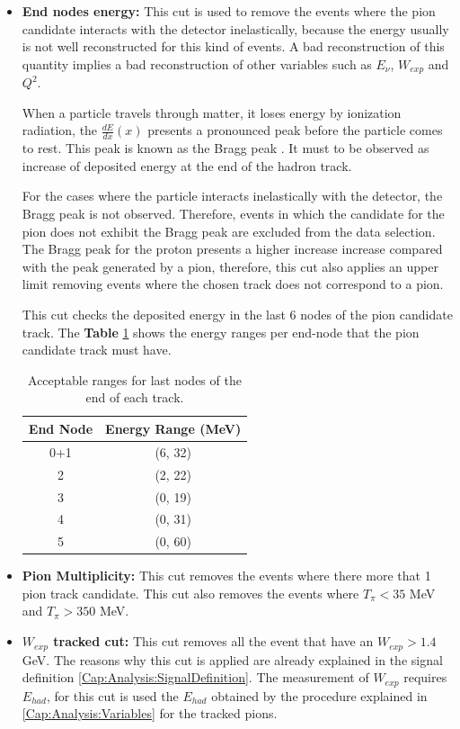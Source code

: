 \begin{itemize}
    
    \item \textbf{End nodes energy:} This cut is used to remove the events where the pion candidate interacts with the detector inelastically, because the energy usually is not well reconstructed for this kind of events. A bad reconstruction of this quantity implies a bad reconstruction of other variables such as $E_\nu$, $W_{exp}$ and $Q^2$. 

    When a particle travels through matter, it loses energy by ionization radiation, the $\frac{dE}{dx}(x)$ presents a pronounced peak before the particle comes to rest. This peak is known as the Bragg peak \cite{BraggCurves}. It must to be observed as increase of deposited energy at the end of the hadron track. 

    For the cases where the particle interacts inelastically with the detector, the Bragg peak is not observed. Therefore, events in which the candidate for the pion does not exhibit the Bragg peak are excluded from the data selection. The Bragg peak for the proton presents a higher increase increase compared with the peak generated by a pion, therefore, this cut also applies an upper limit removing events where the chosen track does not correspond to a pion. 

    This cut checks the deposited energy in the last 6 nodes of the pion candidate track. The \textbf{Table} \ref{tab:Analysis:Cuts:EndnodeCuts} shows the energy ranges per end-node that the pion candidate track must have.  

    \begin{table}[]
        \centering
        \begin{tabular}{c|c}
            End Node & Energy Range (MeV)\\ \hline
            0+1      & (6, 32) \\
            2        & (2, 22) \\
            3        & (0, 19) \\
            4        & (0, 31) \\
            5        & (0, 60) \\
        \end{tabular}
        \caption{Acceptable ranges for last nodes of the end of each track.}
        \label{tab:Analysis:Cuts:EndnodeCuts}
    \end{table}

    
    \item \textbf{Pion Multiplicity:} This cut removes the events where there more that 1 pion track candidate. This cut also removes the events where $T_\pi < 35$ MeV and $T_\pi > 350$ MeV. 
    \item \textbf{$W_{exp}$ tracked cut:} This cut removes all the event that have an $W_{exp} > 1.4$ GeV. The reasons why this cut is applied are already explained in the signal definition \ref{Cap:Analysis:SignalDefinition}. The measurement of $W_{exp}$ requires $E_{had}$, for this cut is used the $E_{had}$ obtained by the procedure explained in \ref{Cap:Analysis:Variables} for the tracked pions. 
    
\end{itemize}

